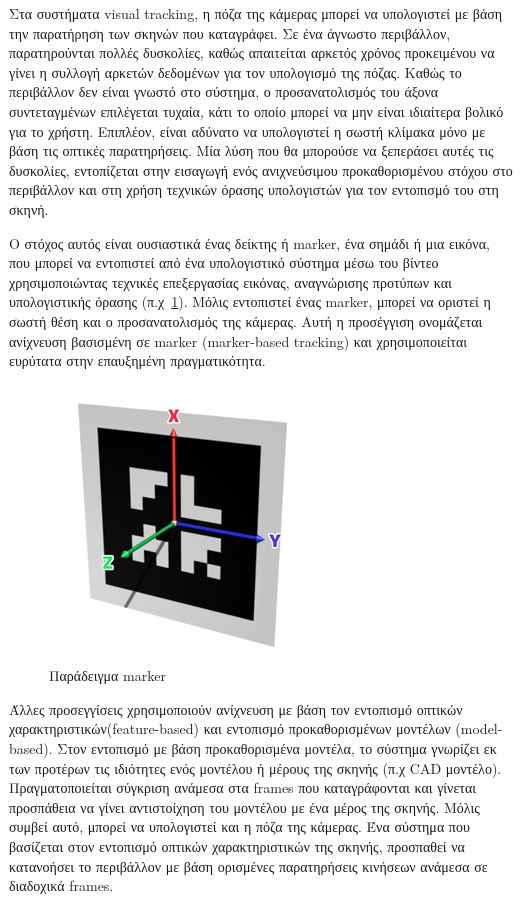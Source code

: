 Στα συστήματα visual tracking, η πόζα της κάμερας μπορεί να υπολογιστεί με βάση την παρατήρηση των σκηνών που καταγράφει. Σε ένα άγνωστο περιβάλλον, παρατηρούνται πολλές δυσκολίες, καθώς απαιτείται αρκετός χρόνος προκειμένου να γίνει η συλλογή αρκετών δεδομένων για τον υπολογισμό της πόζας. Καθώς το περιβάλλον δεν είναι γνωστό στο σύστημα, ο προσανατολισμός του άξονα συντεταγμένων επιλέγεται τυχαία, κάτι το οποίο μπορεί να μην είναι ιδιαίτερα βολικό για το χρήστη. Επιπλέον, είναι αδύνατο να υπολογιστεί η σωστή κλίμακα μόνο με βάση τις οπτικές παρατηρήσεις. Μία λύση που θα μπορούσε να ξεπεράσει αυτές τις δυσκολίες, εντοπίζεται στην εισαγωγή ενός ανιχνεύσιμου προκαθορισμένου στόχου στο περιβάλλον και στη χρήση τεχνικών όρασης υπολογιστών για τον εντοπισμό του στη σκηνή. 


Ο στόχος αυτός είναι ουσιαστικά ένας δείκτης ή marker, ένα σημάδι ή μια εικόνα, που μπορεί να εντοπιστεί από ένα υπολογιστικό σύστημα μέσω του βίντεο χρησιμοποιώντας τεχνικές επεξεργασίας εικόνας, αναγνώρισης προτύπων και υπολογιστικής όρασης (π.χ~\ref{fig:marker}). Μόλις εντοπιστεί ένας marker, μπορεί να οριστεί η σωστή θέση και ο προσανατολισμός της κάμερας. Αυτή η προσέγγιση ονομάζεται ανίχνευση βασισμένη σε marker (marker-based tracking) και χρησιμοποιείται ευρύτατα στην επαυξημένη πραγματικότητα.%

\begin{figure}[H]
    \centering
    \includegraphics[scale=0.6, angle=0]{Files/Figures/marker-axis.jpg}
    \caption[Παράδειγμα marker]{ Παράδειγμα marker}
    \label{fig:marker}
\end{figure}




Άλλες προσεγγίσεις χρησιμοποιούν ανίχνευση με βάση τον εντοπισμό οπτικών χαρακτηριστικών(feature-based) και εντοπισμό προκαθορισμένων μοντέλων (model-based). Στον εντοπισμό με βάση προκαθορισμένα μοντέλα, το σύστημα γνωρίζει εκ των προτέρων τις ιδιότητες ενός μοντέλου ή μέρους της σκηνής (π.χ CAD μοντέλο). Πραγματοποιείται σύγκριση ανάμεσα στα frames που καταγράφονται και γίνεται προσπάθεια να γίνει αντιστοίχηση του μοντέλου με ένα μέρος της σκηνής. Μόλις συμβεί αυτό, μπορεί να υπολογιστεί και η πόζα της κάμερας. Ένα σύστημα που βασίζεται στον εντοπισμό οπτικών χαρακτηριστικών της σκηνής, προσπαθεί να κατανοήσει το περιβάλλον με βάση ορισμένες παρατηρήσεις κινήσεων ανάμεσα σε διαδοχικά frames. 


